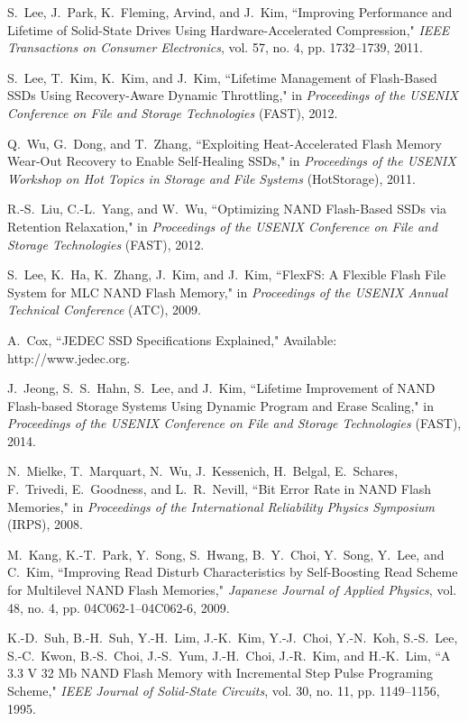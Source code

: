 \begin{thebibliography}{00}
S.~Lee, J.~Park, K.~Fleming, Arvind, and J.~Kim,
``Improving Performance and Lifetime of Solid-State Drives Using Hardware-Accelerated Compression,"
\textit{IEEE Transactions on Consumer Electronics}, vol. 57, no. 4, pp. 1732--1739, 2011.

S.~Lee, T.~Kim, K.~Kim, and J.~Kim,
``Lifetime Management of Flash-Based SSDs Using Recovery-Aware Dynamic Throttling,"
in \textit{Proceedings of the USENIX Conference on File and Storage Technologies} (FAST), 2012.

Q.~Wu, G.~Dong, and T.~Zhang,
``Exploiting Heat-Accelerated Flash Memory Wear-Out Recovery to Enable Self-Healing SSDs,"
in \emph{Proceedings of the USENIX Workshop on Hot Topics in Storage and File Systems} (HotStorage), 2011.

R.-S.~Liu, C.-L.~Yang, and W.~Wu,
``Optimizing NAND Flash-Based SSDs via Retention Relaxation,"
in \textit{Proceedings of the USENIX Conference on File and Storage Technologies} (FAST), 2012.

S.~Lee, K.~Ha, K.~Zhang, J.~Kim, and J.~Kim,
``FlexFS: A Flexible Flash File System for MLC NAND Flash Memory,"
in \emph{Proceedings of the USENIX Annual Technical Conference} (ATC), 2009.

A.~Cox,
``JEDEC SSD Specifications Explained,"
Available: http://www.jedec.org.

J.~Jeong, S.~S.~Hahn, S.~Lee, and J.~Kim,
``Lifetime Improvement of NAND Flash-based Storage Systems Using Dynamic Program and Erase Scaling," 
in \emph{Proceedings of the USENIX Conference on File and Storage Technologies} (FAST), 2014.

N.~Mielke, T.~Marquart, N.~Wu, J.~Kessenich, H.~Belgal, E.~Schares, F.~Trivedi, E.~Goodness, and L.~R.~Nevill,
``Bit Error Rate in NAND Flash Memories,"
in \emph{Proceedings of the International Reliability Physics Symposium} (IRPS), 2008.

M.~Kang, K.-T.~Park, Y.~Song, S.~Hwang, B.~Y.~Choi, Y.~Song, Y.~Lee, and C.~Kim,
``Improving Read Disturb Characteristics by Self-Boosting Read Scheme for Multilevel NAND Flash Memories,"
\emph{Japanese Journal of Applied Physics}, vol. 48, no. 4, pp. 04C062-1--04C062-6, 2009.

K.-D.~Suh, B.-H.~Suh, Y.-H.~Lim, J.-K.~Kim, Y.-J.~Choi, Y.-N.~Koh, S.-S.~Lee, S.-C.~Kwon, B.-S.~Choi, J.-S.~Yum, J.-H.~Choi, J.-R.~Kim, and H.-K.~Lim,
``A 3.3 V 32 Mb NAND Flash Memory with Incremental Step Pulse Programing Scheme,"
\emph{IEEE Journal of Solid-State Circuits}, vol. 30, no. 11, pp. 1149--1156, 1995.


\end{thebibliography}
